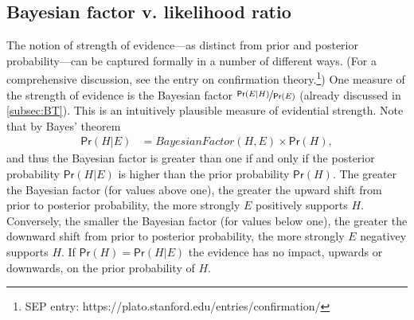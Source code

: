 \documentclass{article}
\newcommand{\pr}{\mathsf{Pr}}
\begin{document}
\subsection{Bayesian factor v. likelihood ratio}
\label{subse:LRlogical}

The notion of  strength of evidence---as distinct from prior and posterior probability---can be captured formally  in a number of different ways.
(For a comprehensive discussion, see the entry on confirmation theory.\footnote{SEP entry: https://plato.stanford.edu/entries/confirmation/})
One measure of the strength of evidence is the Bayesian factor $\nicefrac{\pr(E \vert H)}{\pr(E)}$ (already discussed in \ref{subsec:BT}). %
This is an intuitively plausible measure of evidential strength. Note that by Bayes' theorem
%
%
\begin{align*}\pr(H \vert E) & = \textit{BayesianFactor}(H, E) \times \pr(H),\end{align*}
%
and thus the Bayesian factor is greater than one if and only if
the posterior probability $\pr(H \vert E)$ is higher than the prior probability $\pr(H)$. %
The greater the Bayesian factor (for values above one), the greater the upward shift from prior to posterior probability, the more strongly $E$ positively supports $H$.
Conversely, the smaller the Bayesian factor (for values below one), the greater the downward shift from prior to posterior probability, the more strongly $E$ negativey supports $H$. If $\pr(H)=\pr(H\vert E)$ the evidence  has no impact, upwards or downwards, on the prior probability of $H$. %

\end{document}
